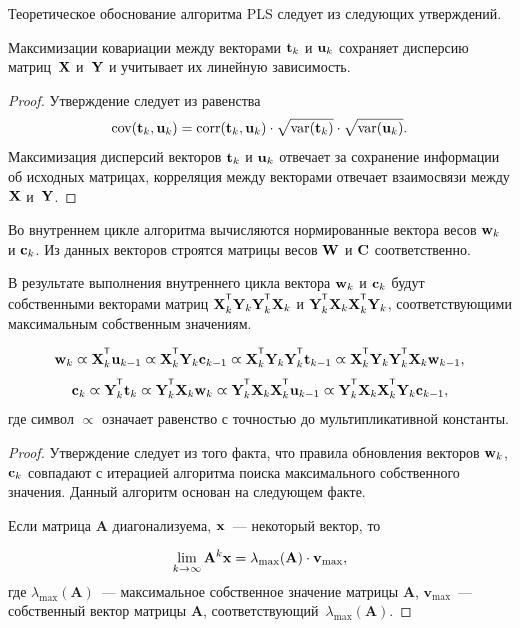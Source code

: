Теоретическое обоснование алгоритма PLS следует из следующих утверждений.
\begin{statement}
	Максимизации ковариации между векторами $\mathbf{t}_k$ и $\mathbf{u}_k$ сохраняет дисперсию матриц~$\mathbf{X}$ и~$\mathbf{Y}$ и учитывает их линейную зависимость.
\end{statement}
\begin{proof}
	Утверждение следует из равенства
	\[
	\text{cov} (\mathbf{t}_k, \mathbf{u}_k) = \text{corr} (\mathbf{t}_k, \mathbf{u}_k) \cdot \sqrt{\text{var}(\mathbf{t}_k)} \cdot \sqrt{\text{var}(\mathbf{u}_k)}.
	\]
	Максимизация дисперсий векторов $\mathbf{t}_k$ и $\mathbf{u}_k$ отвечает за сохранение информации об исходных матрицах, 
	корреляция между векторами отвечает взаимосвязи между $\mathbf{X}$ и~$\mathbf{Y}$. 
\end{proof}

Во внутреннем цикле алгоритма вычисляются нормированные вектора весов $\mathbf{w}_k$ и $\mathbf{c}_k$. 
Из данных векторов строятся матрицы весов $\mathbf{W}$ и $\mathbf{C}$ соответственно.

\begin{statement}
	В результате выполнения внутреннего цикла вектора $\mathbf{w}_k$ и $\mathbf{c}_k$ будут собственными векторами матриц $\bX_k^{\T} \bY_k \bY_k^{\T} \bX_k$ и $\bY_k^{\T} \bX_k \bX_k^{\T} \bY_k$, соответствующими максимальным собственным значениям.
	
	\begin{equation*}
		\bw_k \varpropto \bX_k^{\T} \bu_{k-1} \varpropto \bX_k^{\T} \bY_k \bc_{k-1} \varpropto \bX_k^{\T} \bY_k \bY_k^{\T} \bt_{k-1} \varpropto \bX_k^{\T} \bY_k \bY_k^{\T} \bX_k \bw_{k-1},
	\end{equation*}
	\begin{equation*}
		\bc_k \varpropto \bY_k^{\T} \bt_k \varpropto \bY_k^{\T} \bX_k \bw_k \varpropto \bY_k^{\T} \bX_k \bX_k^{\T} \bu_{k-1} \varpropto \bY_k^{\T} \bX_k \bX_k^{\T} \bY_k \bc_{k-1},
	\end{equation*}
	где символ $\varpropto$ означает равенство с точностью до мультипликативной константы. 
	\label{st:eig}
\end{statement}
\begin{proof}
	Утверждение следует из того факта, что правила обновления векторов $\mathbf{w}_k$, $\mathbf{c}_k$ совпадают с итерацией алгоритма поиска максимального собственного значения. 
	Данный алгоритм основан на следующем факте.
	
	Если матрица $\mathbf{A}$ диагонализуема, $\mathbf{x}$~--- некоторый вектор, то
	
	\[
	\lim_{k \rightarrow \infty} \mathbf{A}^k \mathbf{x} = \lambda_{\max}(\mathbf{A}) \cdot \mathbf{v}_{\max},
	\]
	где $ \lambda_{\max} (\mathbf{A})$~--- максимальное собственное значение матрицы $\mathbf{A}$, $\mathbf{v}_{\max}$~---собственный вектор матрицы $\mathbf{A}$, соответствующий~$\lambda_{\max} (\mathbf{A})$.
	
\end{proof}

